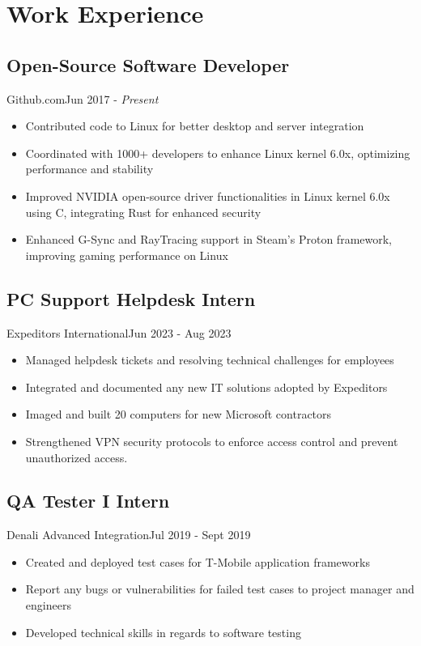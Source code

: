 \section{Work Experience}
\subsection{Open-Source Software Developer}{Github.com}{Jun 2017 - \textit{Present}}
\begin{itemize}
  \item Contributed code to Linux for better desktop and server integration
  \item Coordinated with 1000+ developers to enhance Linux kernel 6.0x, optimizing performance and stability
  \item Improved NVIDIA open-source driver functionalities in Linux kernel 6.0x using C, integrating Rust for enhanced security
  \item Enhanced G-Sync and RayTracing support in Steam’s Proton framework, improving gaming performance on Linux
\end{itemize}
\subsection{PC Support Helpdesk Intern}{Expeditors International}{Jun 2023 - Aug 2023}
\begin{itemize}
    \item Managed helpdesk tickets and resolving technical challenges for employees
    \item Integrated and documented any new IT solutions adopted by Expeditors
    \item Imaged and built 20 computers for new Microsoft contractors
    \item Strengthened VPN security protocols to enforce access control and prevent unauthorized access.

\end{itemize}
\subsection{QA Tester I Intern}{Denali Advanced Integration}{Jul 2019 - Sept 2019}
\begin{itemize}
   \item Created and deployed test cases for T-Mobile application frameworks
    \item Report any bugs or vulnerabilities for failed test cases to project manager and engineers  
    \item Developed technical skills in regards to software testing
\end{itemize}
